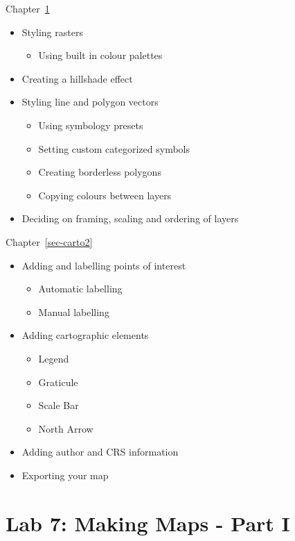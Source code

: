 \documentclass[
  letterpaper,
  DIV=11,
  numbers=noendperiod]{scrreprt}
\providecommand{\tightlist}{%
  \setlength{\itemsep}{0pt}\setlength{\parskip}{0pt}}\usepackage{longtable,booktabs,array}
\begin{document}
Chapter~\ref{sec-carto1}

\begin{itemize}
\tightlist
\item
  Styling rasters

  \begin{itemize}
  \tightlist
  \item
    Using built in colour palettes
  \end{itemize}
\item
  Creating a hillshade effect
\item
  Styling line and polygon vectors

  \begin{itemize}
  \tightlist
  \item
    Using symbology presets
  \item
    Setting custom categorized symbols
  \item
    Creating borderless polygons
  \item
    Copying colours between layers
  \end{itemize}
\item
  Deciding on framing, scaling and ordering of layers
\end{itemize}

Chapter~\ref{sec-carto2}

\begin{itemize}
\tightlist
\item
  Adding and labelling points of interest

  \begin{itemize}
  \tightlist
  \item
    Automatic labelling
  \item
    Manual labelling
  \end{itemize}
\item
  Adding cartographic elements

  \begin{itemize}
  \tightlist
  \item
    Legend
  \item
    Graticule
  \item
    Scale Bar
  \item
    North Arrow
  \end{itemize}
\item
  Adding author and CRS information
\item
  Exporting your map
\end{itemize}

\chapter{Lab 7: Making Maps - Part I}\label{sec-carto1}
\end{document}

